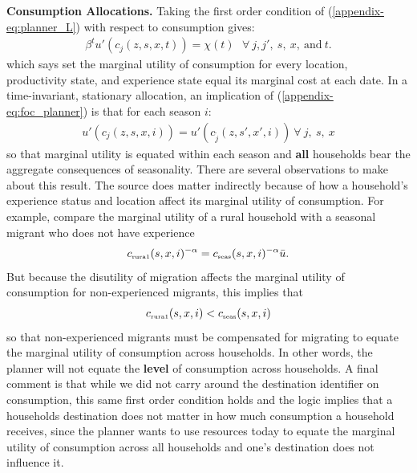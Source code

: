 \documentclass[12pt,pdftex]{article}
\begin{document}
\textbf{Consumption Allocations.} Taking the first order condition of (\ref{appendix-eq:planner_L}) with respect to consumption gives:
\begin{align}
\beta^{t}u'(c_{j}(z, s, x, t)) = \chi(t) \ \ \ \forall \ j, j', \ s, \ x, \ \mbox{and} \ t.
\label{appendix-eq:foc_planner}
\end{align}
which says set the marginal utility of consumption for every location, productivity state, and experience state equal its marginal cost at each date. In a time-invariant, stationary allocation, an implication of (\ref{appendix-eq:foc_planner}) is that for each season $i$:
\begin{align}
u'(c_{j}(z, s, x, i)) = u'(c_{\tilde{j}}(z, s', x', i)) \ \forall \ j, \ s, \ x
\label{appendix-eq:foc_planner2}
\end{align}
so that marginal utility is equated within each season and \textbf{all} households bear the aggregate consequences of seasonality. There are several observations to make about this result.  The source does matter indirectly because of how a household's experience status and location affect its marginal utility of consumption. For example, compare the marginal utility of a rural household with a seasonal migrant who does not have experience
\begin{align}
c_{\mbox{\tiny rura1}}(s, x, i)^{-\alpha} = c_{\mbox{\tiny seas}}(s, x, i)^{-\alpha}\bar u.
\end{align}
But because the disutility of migration affects the marginal utility of consumption for non-experienced migrants, this implies that
\begin{align}
c_{\mbox{\tiny rura1}}(s, x, i) < c_{\mbox{\tiny seas}}(s, x, i)
\end{align}
so that non-experienced migrants must be compensated for migrating to equate the marginal utility of consumption across households. In other words, the planner will not equate the \textbf{level} of consumption across households. A final comment is that while we did not carry around the destination identifier on consumption, this same first order condition holds and the logic implies that a households destination does not matter in how much consumption a household receives, since the planner wants to use resources today to equate the marginal utility of consumption across all households and one's destination does not influence it.
\end{document}
